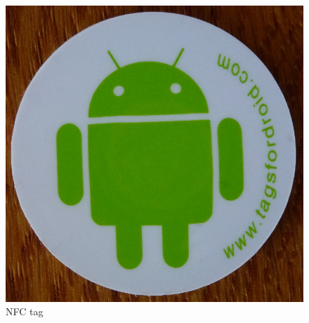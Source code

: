 \documentclass[numbers=noenddot, abstract=on, a4paper, headsepline,
footsepline, oneside, draft=off]{scrreprt}
\begin{document}
\begin{figure}[!htb]
\begin{minipage}{.5\textwidth}
		\includegraphics[height=.2\textheight]{img/nfc_tag}
		\caption{NFC tag}
		\label{fig:handbook_nfctag}
	\end{minipage}
\end{figure}
\end{document}
